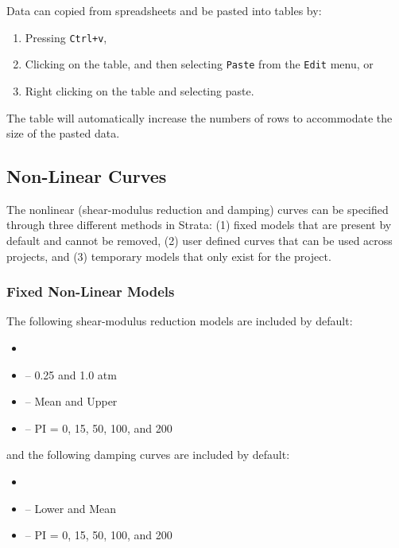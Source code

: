 \documentclass[12pt,oneside]{book}
\begin{document}
Data can copied from spreadsheets and be pasted into tables by:
\begin{enumerate}
    \item Pressing \texttt{Ctrl+v}, 
    \item Clicking on the table, and then selecting \texttt{Paste} from the \texttt{Edit} menu, or
    \item Right clicking on the table and selecting paste.
\end{enumerate}
The table will automatically increase the numbers of rows to accommodate the size of the pasted
data.

\subsection{Non-Linear Curves}
The nonlinear (shear-modulus reduction and damping) curves can be specified through three
different methods in Strata: (1) fixed models that are present by default and cannot be removed, (2)
user defined curves that can be used across projects, and (3) temporary models that only exist for
the project.

\subsubsection{Fixed Non-Linear Models}

The following shear-modulus reduction models are included by default:
\begin{itemize}
    \item \citet{darendeli:01}
    \item \citet{iwasaki:76} -- 0.25 and 1.0 atm
    \item \citet{seed:70} -- Mean and Upper
    \item \citet{vucetic:91} -- PI = 0, 15, 50, 100, and 200
\end{itemize}
and the following damping curves are included by default:
\begin{itemize}
    \item \citet{darendeli:01}
    \item \citet{seed:70} -- Lower and Mean
    \item \citet{vucetic:91} -- PI = 0, 15, 50, 100, and 200
\end{itemize}
\end{document}
